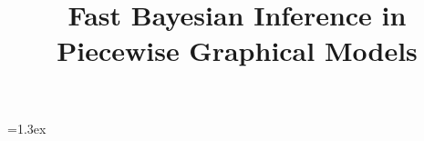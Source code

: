 \usepackage{algorithmic} %
\usepackage[vlined,algoruled,titlenumbered,noend]{algorithm2e}

\usepackage{verbatim} %

\newtheorem{theorem}{Theorem}
\newtheorem{proposition}{Proposition}
\newtheorem{example}{Example}
\def\fexample#1#2#3{\vspace{-1ex}\begin{example}[#2]\label{#1}\rm #3
\hspace*{\fill} $\diamondsuit\quad$ \end{example}\vspace{-2ex} }
\newcommand{\tuple}[1] {\langle #1 \rangle}
\newcommand{\bvec}[1]{\textbf{#1}}
\newcommand{\indicator}{\mathbb{I}}%

\def\eqvsp{}  \newdimen\paravsp  \paravsp=1.3ex
\def\paradot#1{\vspace{\paravsp plus 0.5\paravsp minus 0.5\paravsp}\noindent{\bf\boldmath{#1.}}}

\def\lgap{3.2mm}%
\newcommand{\svdots}{\vspace{-\lgap}.\vspace{-\lgap}\\.\vspace{-\lgap}\\.} %

\title{
Fast Bayesian Inference in Piecewise Graphical Models
}


